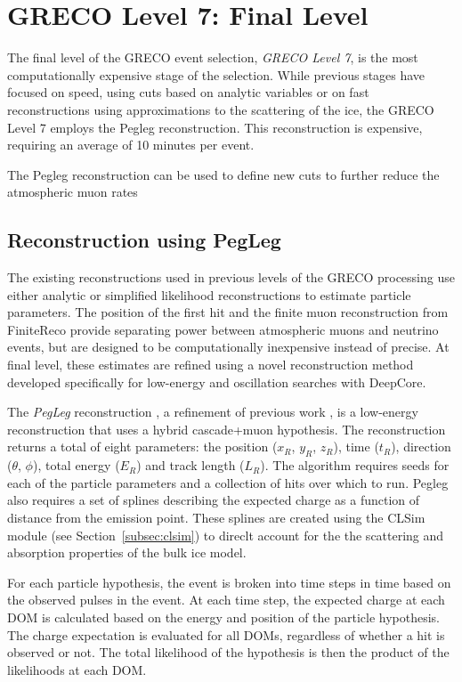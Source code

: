 \section{GRECO Level 7: Final Level}
The final level of the GRECO event selection, \emph{GRECO Level 7}, is the most computationally expensive stage of the selection.
While previous stages have focused on speed, using cuts based on analytic variables or on fast reconstructions using approximations to the scattering of the ice, the GRECO Level 7 employs the Pegleg reconstruction.
This reconstruction is expensive, requiring an average of 10 minutes per event.

The Pegleg reconstruction can be used to define new cuts to further reduce the atmospheric muon rates


\label{subsec:pegleg_reco}
\subsection{Reconstruction using PegLeg}
The existing reconstructions used in previous levels of the GRECO processing  use either analytic or simplified likelihood reconstructions to estimate particle parameters.
The position of the first hit and the finite muon reconstruction from FiniteReco provide separating power between atmospheric muons and neutrino events, but are designed to be computationally inexpensive instead of precise.
At final level, these estimates are refined using a novel reconstruction method developed specifically for low-energy and oscillation searches with DeepCore.

The \emph{PegLeg} reconstruction \cite{Thesis-Martin}, a refinement of previous work \cite{Thesis-Dunkman}, is a low-energy reconstruction that uses a hybrid cascade+muon hypothesis.
The reconstruction returns a total of eight parameters: the position ($x_R$, $y_R$, $z_R$), time ($t_{R}$), direction ($\theta$, $\phi$), total energy ($E_{R}$) and track length ($L_{R}$). 
The algorithm requires seeds for each of the particle parameters and a collection of hits over which to run.
Pegleg also requires a set of splines describing the expected charge as a function of distance from the emission point.
These splines are created using the CLSim module (see Section~\ref{subsec:clsim}) to direclt account for the the scattering and absorption properties of the bulk ice model.

For each particle hypothesis, the event is broken into time steps in time based on the observed pulses in the event.
At each time step, the expected charge at each DOM is calculated based on the energy and position of the particle hypothesis.
The charge expectation is evaluated for all DOMs, regardless of whether a hit is observed or not.
The total likelihood of the hypothesis is then the product of the likelihoods at each DOM.

